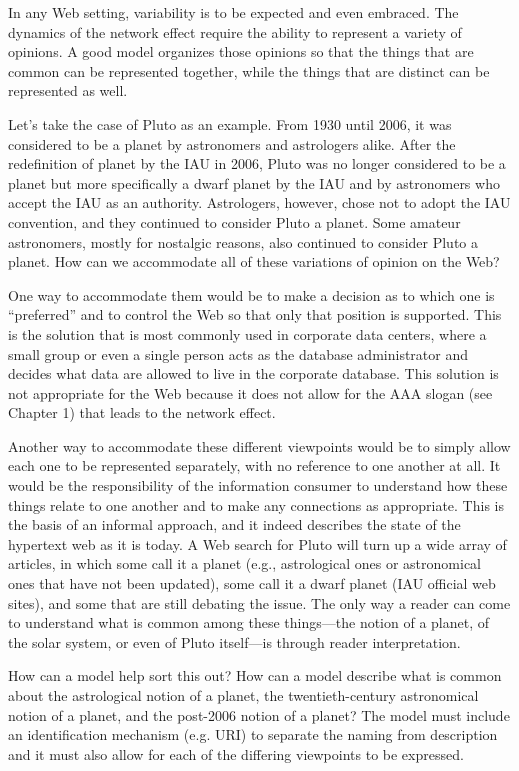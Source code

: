 In any Web setting, variability is to be expected and even embraced. The
dynamics of the network effect require the ability to represent a
variety of opinions. A good model organizes those opinions so that the
things that are common can be represented together, while the things
that are distinct can be represented as well.

Let's take the case of Pluto as an example. From 1930 until 2006, it was
considered to be a planet by astronomers and astrologers alike. After
the redefinition of planet by the IAU in 2006, Pluto was no longer
considered to be a planet but more specifically a dwarf planet by the
IAU and by astronomers who accept the IAU as an authority. Astrologers,
however, chose not to adopt the IAU convention, and they continued to
consider Pluto a planet. Some amateur astronomers, mostly for nostalgic
reasons, also continued to consider Pluto a planet. How can we
accommodate all of these variations of opinion on the Web?

One way to accommodate them would be to make a decision as to which one
is ``preferred'' and to control the Web so that only that position is
supported. This is the solution that is most commonly used in corporate
data centers, where a small group or even a single person acts as the
database administrator and decides what data are allowed to live in the
corporate database. This solution is not appropriate for the Web because
it does not allow for the AAA slogan (see Chapter 1) that leads to the
network effect.

Another way to accommodate these different viewpoints would be to simply
allow each one to be represented separately, with no reference to one
another at all. It would be the responsibility of the information
consumer to understand how these things relate to one another and to
make any connections as appropriate. This is the basis of an informal
approach, and it indeed describes the state of the hypertext web as it is
today. A Web search for Pluto will turn up a wide array of articles, in
which some call it a planet (e.g., astrological ones or astronomical
ones that have not been updated), some call it a dwarf planet (IAU
official web sites), and some that are still debating the issue. The
only way a reader can come to understand what is common among these
things---the notion of a planet, of the solar system, or even of Pluto
itself---is through reader interpretation.

How can a model help sort this out? How can a model describe what is
common about the astrological notion of a planet, the twentieth-century
astronomical notion of a planet, and the post-2006 notion of a planet?
The model must include an identification mechanism (e.g. URI) to
separate the naming from description and it must also allow for each of
the differing viewpoints to be expressed.

